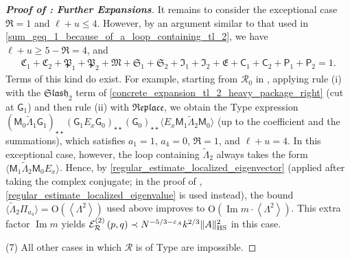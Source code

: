 \documentclass[10pt,reqno]{amsart}
\numberwithin{equation}{section}
\numberwithin{figure}{section}
\newcommand{\rmnum}[1]{\uppercase\expandafter{\romannumeral #1}}
\theoremstyle{plain} %
\theoremstyle{definition} %
\newcommand{\wt}{\widetilde}
\renewcommand{\txt}[1]{\text{\rm{#1}}}
\newcommand{\cR}{{\mathcal R}}
\newcommand{\cE}{{\mathcal{E}}}
\newcommand{\fR}{\mathfrak R}
\newcommand{\fC}{\mathfrak C}
\newcommand{\fP}{\mathfrak P}
\newcommand{\fM}{\mathfrak M}
\newcommand{\fS}{\mathfrak S}
\newcommand{\fI}{\mathfrak I}
\newcommand{\fE}{\mathfrak E}
\newcommand{\sG}{\mathsf G}
\newcommand{\sM}{\mathsf M}
\newcommand{\sC}{\mathsf C}
\newcommand{\sP}{\mathsf P}
\renewcommand{\leq}{\le}
\renewcommand{\geq}{\ge}
\newcommand{\pa}[1]{\left({#1}\right)}
\newcommand{\norm}[1]{\lVert #1 \rVert}
\newcommand{\avg}[1]{\langle #1 \rangle}
\newcommand{\avga}[1]{\left\langle #1 \right\rangle}
\DeclareMathOperator{\im}{\mathrm{Im}}
\newcommand{\tLambda}{{\wt{\Lambda}}}
\newcommand{\freplace}{\mathfrak{Replace}}
\newcommand{\fslash}[1]{\mathfrak{Slash}_{#1}}
\newcommand{\OO}{\mathrm{O}}
\newcommand{\HS}{\txt{HS}}
\newcommand{\tl}{\tLambda}
\newcommand{\mm}{\ell}
\numberwithin{equation}{section}
\begin{document}
\begin{proof}[\bf Proof of : Further Expansions]
        It remains to consider the exceptional case $\fR=1$ and $\mm+u\leq 4$. However, by an argument similar to that used in \eqref{sum_geq_1_because_of_a_loop_containing_tl_2}, we have $\mm+u\geq 5-\fR=4$, and
        \begin{equation}\nonumber
            \begin{aligned}
                \fC_1+\fC_2+\fP_1+\fP_2+\fM+\fS_1+\fS_2+\fI_1+\fI_2+\fE+\sC_1+\sC_2+\sP_1+\sP_2= 1.
            \end{aligned}
        \end{equation}
    Terms of this kind do exist. For example, starting from $\cR_0$ in , applying rule (i) with the $\fslash{2}$ term of \eqref{concrete_expansion_tl_2_heavy_package_right} (cut at $\sG_1$) and then rule (ii) with $\freplace$, we obtain the Type \rmnum{2} expression $(\sM_0\tl_1\sG_1)_{\star\star}(\sG_1E_x\sG_0)_{\star\star}(\sG_0)_{\star\star}\avg{E_x\sM_1\tl_2\sM_0}$ (up to the coefficient and the summations), which satisfies $a_1=1$, $a_4=0$, $\fR=1$, and $\mm+u=4$. In this exceptional case, however, the loop containing $\tl_2$ always takes the form $\avg{\sM_1\tl_2\sM_0E_x}$. Hence, by \eqref{regular_estimate_localized_eigenvector} (applied after taking the complex conjugate; in the proof of , \eqref{regular_estimate_localized_eigenvalue} is used instead), the bound $\avg{\tl_2\Pi_{a_4}}=\OO(\avga{\Lambda^2})$ used above improves to $\OO(\im m\cdot\avga{\Lambda^2})$. This extra factor $\im m$ yields ${\cE_{\cR}^{\pa{2}}\pa{p,q}}\prec N^{-5/3-\varepsilon_A}k^{2/3}\norm{A}_{\HS}^2$ in this case.

\smallskip

        \noindent(7) All other cases in which $\cR$ is of Type \rmnum{2} are impossible. %

\smallskip



\end{proof}
\end{document}
